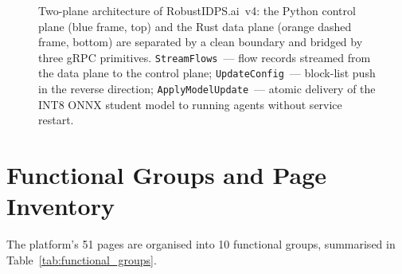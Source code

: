 \begin{figure}[H]
\caption{Two-plane architecture of \textsf{RobustIDPS.ai}~v4: the
Python control plane (blue frame, top) and the Rust data plane
(orange dashed frame, bottom) are separated by a clean boundary and
bridged by three gRPC primitives. \texttt{StreamFlows}~--- flow
records streamed from the data plane to the control plane;
\texttt{UpdateConfig}~--- block-list push in the reverse direction;
\texttt{ApplyModelUpdate}~--- atomic delivery of the INT8 ONNX
student model to running agents without service restart.}
\label{fig:two_plane_arch}
\end{figure}


\section{Functional Groups and Page Inventory}
\label{sec:functional_groups}

The platform's 51 pages are organised into 10 functional groups, summarised in Table~\ref{tab:functional_groups}.

